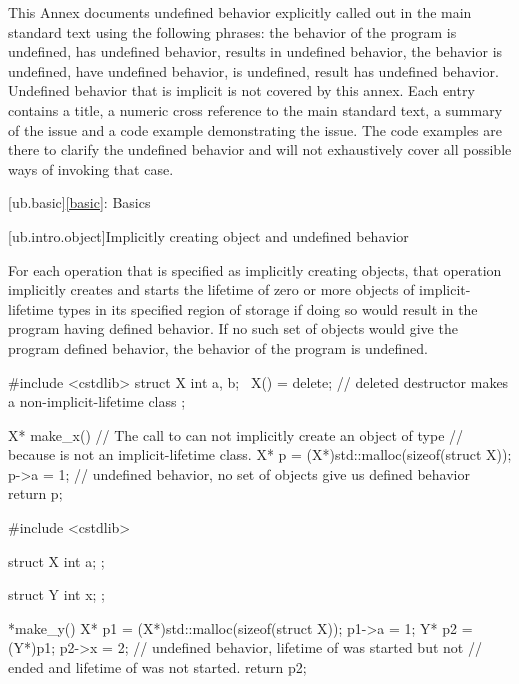 
This Annex documents undefined behavior explicitly called out in the main standard text using the
following phrases: the behavior of the program is undefined, has undefined behavior, results in
undefined behavior, the behavior is undefined, have undefined behavior, is undefined, result has
undefined behavior. Undefined behavior that is implicit is not covered by this annex. Each entry contains
a title, a numeric cross reference to the main standard text, a summary of the issue and a code example
demonstrating the issue. The code examples are there to clarify the undefined behavior and will not
exhaustively cover all possible ways of invoking that case.

[ub.basic]{\ref{basic}: Basics}

[ub.intro.object]{Implicitly creating object and undefined behavior}

\pnum
{}
For each
operation that is specified as implicitly creating objects, that operation implicitly creates and starts the
lifetime of zero or more objects of implicit-lifetime types  in its specified region of storage if doing so
would result in the program having defined behavior. If no such set of objects would give the program defined
behavior, the behavior of the program is undefined.

\pnum
\begin{example}
\begin{codeblock}
#include <cstdlib>
struct X {
  int a, b;
  ~X() = delete;        // deleted destructor makes  a non-implicit-lifetime class
};

X* make_x() {
        // The call to  can not implicitly create an object of type 
        // because  is not an implicit-lifetime class.
  X* p = (X*)std::malloc(sizeof(struct X));
  p->a = 1;     // undefined behavior, no set of objects give us defined behavior
  return p;
}
\end{codeblock}
\end{example}
\begin{example}
\begin{codeblock}
#include <cstdlib>

struct X {
  int a;
};

struct Y {
  int x;
};

*make_y() {
  X* p1 = (X*)std::malloc(sizeof(struct X));
  p1->a = 1;
  Y* p2 = (Y*)p1;
  p2->x = 2;    // undefined behavior, lifetime of  was started but not
                // ended and lifetime of  was not started.
  return p2;
}
\end{codeblock}
\end{example}

